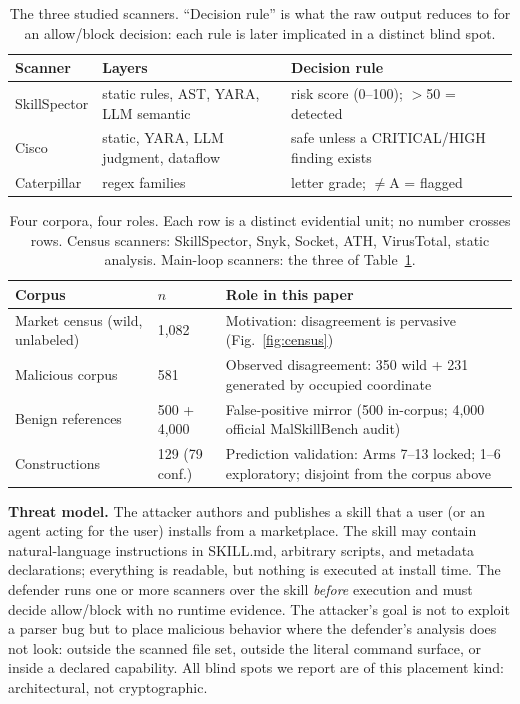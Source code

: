 \documentclass[sigconf,nonacm]{acmart}
\begin{document}
\begin{table}[t]
\caption{The three studied scanners. ``Decision rule'' is what the raw output reduces to for an allow/block decision: each rule is later implicated in a distinct blind spot.}
\label{tab:scanners}
\small
\begin{tabular}{@{}p{1.5cm}p{2.6cm}p{3.6cm}@{}}
\toprule
Scanner & Layers & Decision rule \\
\midrule
SkillSpector & static rules, AST, YARA, LLM semantic & risk score (0--100); $>$50 = detected \\
Cisco & static, YARA, LLM judgment, dataflow & safe unless a CRITICAL/HIGH finding exists \\
Caterpillar & regex families & letter grade; $\neq$A = flagged \\
\bottomrule
\end{tabular}
\end{table}

\begin{table}[t]
\caption{Four corpora, four roles. Each row is a distinct evidential unit; no number crosses rows. Census scanners: SkillSpector, Snyk, Socket, ATH, VirusTotal, static analysis. Main-loop scanners: the three of Table~\ref{tab:scanners}.}
\label{tab:datasets}
\small
\begin{tabular}{@{}p{2.7cm}p{1.5cm}p{3.6cm}@{}}
\toprule
Corpus & $n$ & Role in this paper \\
\midrule
Market census (wild, unlabeled) & 1{,}082 & Motivation: disagreement is pervasive (Fig.~\ref{fig:census}) \\
Malicious corpus & 581 & Observed disagreement: 350 wild + 231 generated by occupied coordinate \\
Benign references & 500 + 4{,}000 & False-positive mirror (500 in-corpus; 4{,}000 official MalSkillBench audit) \\
Constructions & 129 (79 conf.) & Prediction validation: Arms 7--13 locked; 1--6 exploratory; disjoint from the corpus above \\
\bottomrule
\end{tabular}
\end{table}

\textbf{Threat model.} The attacker authors and publishes a skill that a user (or an agent acting for the user) installs from a marketplace. The skill may contain natural-language instructions in SKILL.md, arbitrary scripts, and metadata declarations; everything is readable, but nothing is executed at install time. The defender runs one or more scanners over the skill \emph{before} execution and must decide allow/block with no runtime evidence. The attacker's goal is not to exploit a parser bug but to place malicious behavior where the defender's analysis does not look: outside the scanned file set, outside the literal command surface, or inside a declared capability. All blind spots we report are of this placement kind: architectural, not cryptographic.
\end{document}
